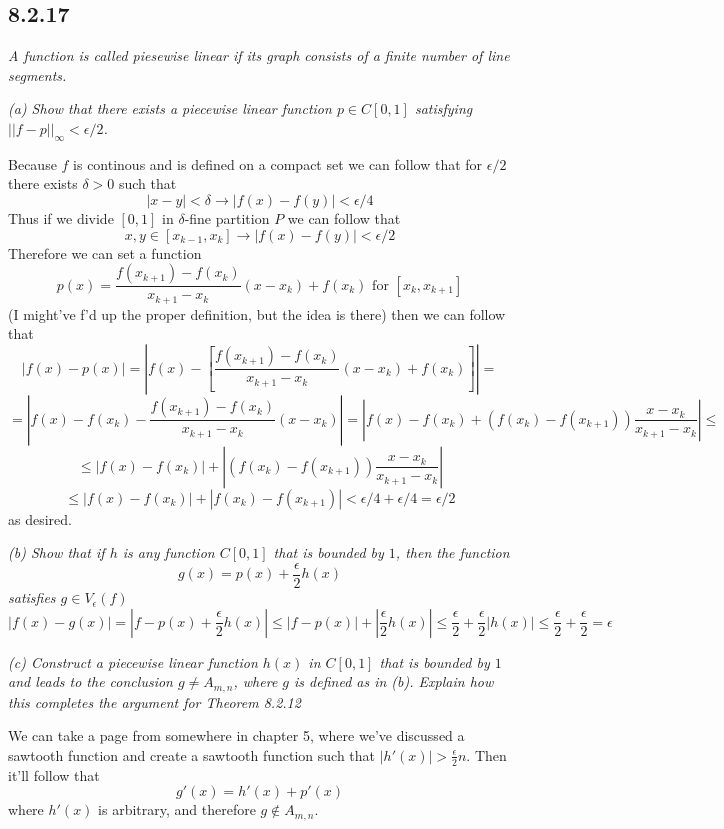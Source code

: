 \documentclass[11pt,oneside,titlepage]{book}
\begin{document}
\subsection*{8.2.17}
\textit{A function is called piesewise linear if its graph consists of a finite
  number of line segments.}

\textit{(a) Show that there exists a piecewise linear function $p \in C[0, 1]$
  satisfying $||f - p||_\infty < \epsilon/2$.}

Because $f$ is continous and is defined on a compact set we can follow that for
$\epsilon/2$ there exists $\delta > 0$ such that
$$|x - y| < \delta \to |f(x) - f(y)| < \epsilon/4$$
Thus if we divide $[0, 1]$ in $\delta$-fine partition $P$ we can follow that
$$x, y \in [x_{k - 1}, x_k] \to |f(x) - f(y)| < \epsilon/2$$
Therefore we can set a function
$$p(x) =
\frac{f(x_{k + 1}) - f(x_k)}{x_{k + 1} - x_k}(x - x_k) + f(x_k) \text{ for } [x_k, x_{k + 1}]$$
(I might've f'd up the proper definition, but the idea is there)
then we can follow that
$$|f(x) - p(x)| = \left|f(x) - \left[\frac{f(x_{k + 1}) -
      f(x_k)}{x_{k + 1} - x_k}(x - x_k) + f(x_k)\right]\right| =
$$
$$ = 
\left|f(x) - f(x_k) - \frac{f(x_{k + 1}) -
    f(x_k)}{x_{k + 1} - x_k}(x - x_k)\right| =
\left|f(x) - f(x_k) + (f(x_{k}) - f(x_{k + 1}))\frac{x - x_k}{x_{k + 1} - x_k}\right|
\leq 
$$
$$ \leq
|f(x) - f(x_k)| + \left|(f(x_{k}) - f(x_{k + 1}))\frac{x - x_k}{x_{k + 1} - x_k}\right|
$$
$$ \leq
|f(x) - f(x_k)| + \left|f(x_{k}) - f(x_{k + 1})\right| < \epsilon/4 + \epsilon/4 = \epsilon/2
$$
as desired.

\textit{(b) Show that if $h$ is any function $C[0, 1]$ that is bounded by $1$, then the function}
$$g(x) = p(x) + \frac{\epsilon}{2}h(x)$$
\textit{satisfies $g \in V_\epsilon(f)$}
$$|f(x) - g(x)| = \left|  f - p(x) + \frac{\epsilon}{2}h(x)\right| \leq
|  f - p(x)| + \left|\frac{\epsilon}{2}h(x)\right| \leq
\frac{\epsilon}{2} + \frac{\epsilon}{2}\left|h(x)\right|
\leq \frac{\epsilon}{2} +\frac{\epsilon}{2} = \epsilon$$

\textit{(c) Construct a piecewise linear function $h(x)$ in $C[0, 1]$ that is bounded by $1$ and
  leads to the conclusion $g \neq A_{m, n}$, where $g$ is defined as in (b). Explain how this
  completes the argument for Theorem 8.2.12}

We can take a page from somewhere in chapter 5, where we've discussed a sawtooth function and
create a sawtooth function such that $|h'(x)| > \frac{\epsilon}{2}n$. Then it'll follow that
$$g'(x) = h'(x) + p'(x)$$
where $h'(x)$ is arbitrary, and therefore $g \notin A_{m, n}$.
\end{document}
